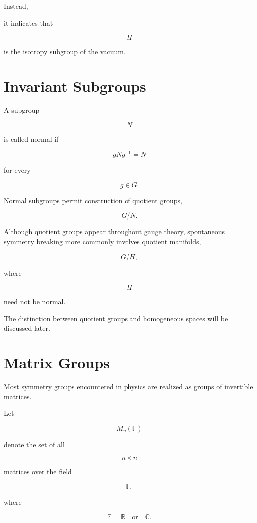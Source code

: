 Instead,

it indicates that

\[
H
\]

is the isotropy subgroup of the vacuum.


\section{Invariant Subgroups}

A subgroup

\[
N
\]

is called normal if

\[
gNg^{-1}
=
N
\]

for every

\[
g\in G.
\]

Normal subgroups permit construction of quotient groups,

\[
G/N.
\]

Although quotient groups appear throughout gauge theory, spontaneous
symmetry breaking more commonly involves quotient manifolds,

\[
G/H,
\]

where

\[
H
\]

need not be normal.

The distinction between quotient groups and homogeneous spaces will be
discussed later.

\section{Matrix Groups}
\label{sec:matrix_groups}

Most symmetry groups encountered in physics are realized as groups of
invertible matrices.

Let

\[
M_n(\mathbb{F})
\]

denote the set of all

\[
n\times n
\]

matrices over the field

\[
\mathbb{F},
\]

where

\[
\mathbb{F}
=
\mathbb{R}
\quad\text{or}\quad
\mathbb{C}.
\]

